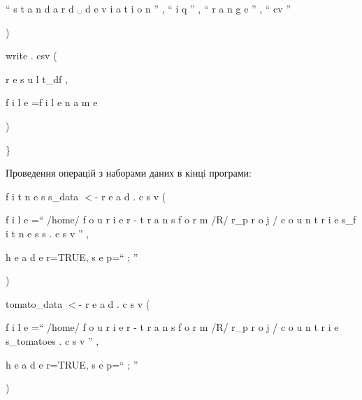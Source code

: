 \documentclass[a4paper,portrait,12pt]{article}
\begin{document}
\begin{flushleft}
{``} s t a n d a r d ␣ d e v i a t i o n '' , {``} i q '' , {``} r a n g e '' , {``} cv ''
\end{flushleft}


)


\begin{flushleft}
write . csv (
\end{flushleft}


\begin{flushleft}
r e s u l t\_df ,
\end{flushleft}


\begin{flushleft}
f i l e =f i l e n a m e
\end{flushleft}


)


\}





\begin{flushleft}
Проведення операцiй з наборами даних в кiнцi програми:
\end{flushleft}


\begin{flushleft}
f i t n e s s\_data $<$- r e a d . c s v (
\end{flushleft}


\begin{flushleft}
f i l e ={``} /home/ f o u r i e r - t r a n s f o r m /R/ r\_p r o j / c o u n t r i e s\_f i t n e s s . c s v '' ,
\end{flushleft}


\begin{flushleft}
h e a d e r=TRUE, s e p={``} ; ''
\end{flushleft}


)


\begin{flushleft}
tomato\_data $<$- r e a d . c s v (
\end{flushleft}


\begin{flushleft}
f i l e ={``} /home/ f o u r i e r - t r a n s f o r m /R/ r\_p r o j / c o u n t r i e s\_tomatoes . c s v '' ,
\end{flushleft}


\begin{flushleft}
h e a d e r=TRUE, s e p={``} ; ''
\end{flushleft}


)
\end{document}
